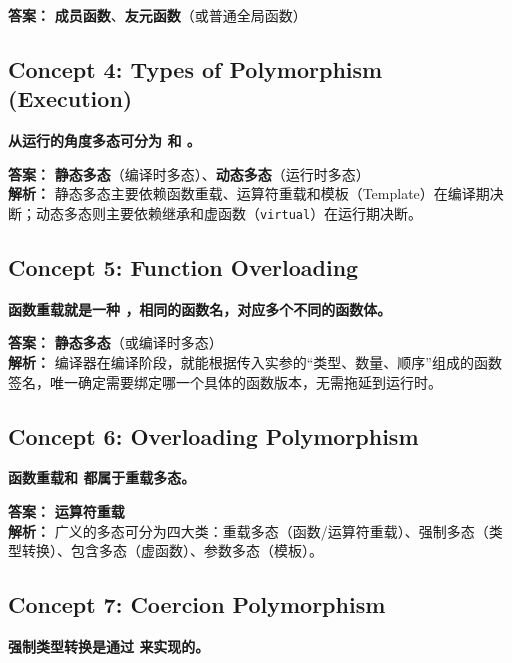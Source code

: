 \documentclass[11pt, a4paper]{article}
\begin{document}
\vspace{0.5em}
\noindent \textbf{答案：} \textbf{成员函数}、\textbf{友元函数}（或普通全局函数）

\subsection*{Concept 4: Types of Polymorphism (Execution)}
\textbf{从运行的角度多态可分为 \underline{\hspace{3cm}} 和 \underline{\hspace{3cm}}。}

\vspace{0.5em}
\noindent \textbf{答案：} \textbf{静态多态}（编译时多态）、\textbf{动态多态}（运行时多态）\\
\textbf{解析：} 静态多态主要依赖函数重载、运算符重载和模板（Template）在编译期决断；动态多态则主要依赖继承和虚函数（\texttt{virtual}）在运行期决断。

\subsection*{Concept 5: Function Overloading}
\textbf{函数重载就是一种 \underline{\hspace{3cm}} ，相同的函数名，对应多个不同的函数体。}

\vspace{0.5em}
\noindent \textbf{答案：} \textbf{静态多态}（或编译时多态）\\
\textbf{解析：} 编译器在编译阶段，就能根据传入实参的“类型、数量、顺序”组成的函数签名，唯一确定需要绑定哪一个具体的函数版本，无需拖延到运行时。

\subsection*{Concept 6: Overloading Polymorphism}
\textbf{函数重载和 \underline{\hspace{3cm}} 都属于重载多态。}

\vspace{0.5em}
\noindent \textbf{答案：} \textbf{运算符重载}\\
\textbf{解析：} 广义的多态可分为四大类：重载多态（函数/运算符重载）、强制多态（类型转换）、包含多态（虚函数）、参数多态（模板）。

\subsection*{Concept 7: Coercion Polymorphism}
\textbf{强制类型转换是通过 \underline{\hspace{3cm}} 来实现的。}
\end{document}
